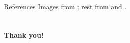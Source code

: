 \documentclass{beamer}
\begin{document}
\section{}
\begin{frame}[t]{References}
    Images from \cite{[2]}; rest from \cite{[2]} and \cite{[1]}.
   
    
\end{frame}

\section{}
\begin{frame}{}
    \begin{center}
        \Large{\textbf{Thank you!}}
    \end{center}
        
\end{frame}
\end{document}
